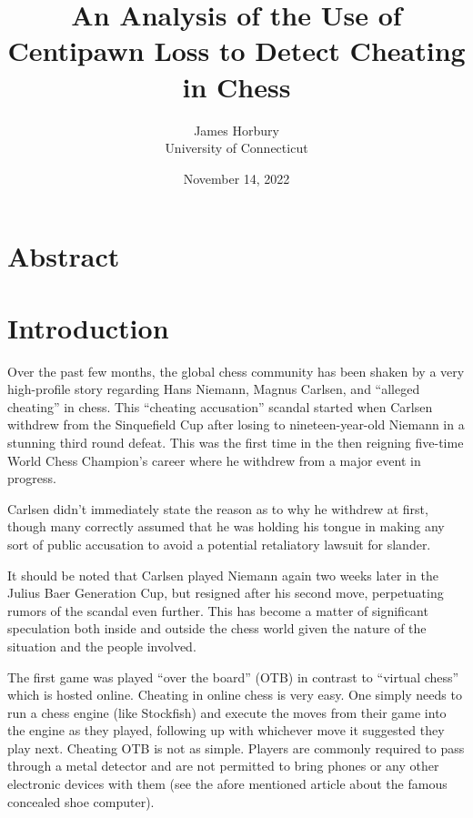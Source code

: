 \documentclass[12pt]{article}
\title{An Analysis of the Use of Centipawn Loss to Detect Cheating in Chess}
\author{James Horbury\\
    University of Connecticut
}
\date{November 14, 2022}
\begin{document}
\maketitle

\section*{Abstract}
\label{sec:abs}


\section*{Introduction}
\label{sec:intro}

Over the past few months, the global chess community has been shaken by a very high-profile story regarding Hans Niemann, Magnus Carlsen, and “alleged cheating” in chess. This “cheating accusation” scandal started when Carlsen withdrew from the Sinquefield Cup after losing to nineteen-year-old Niemann in a stunning third round defeat. This was the first time in the then reigning five-time World Chess Champion's career where he withdrew from a major event in progress.


Carlsen didn't immediately state the reason as to why he withdrew at first, though many correctly assumed that he was holding his tongue in making any sort of public accusation to avoid a potential retaliatory lawsuit for slander.

It should be noted that Carlsen played Niemann again two weeks later in the Julius Baer Generation Cup, but resigned after his second move, perpetuating rumors of the scandal even further. 
This has become a matter of significant speculation both inside and outside the chess world given the nature of the situation and the people involved. 

The first game was played “over the board” (OTB) in contrast to “virtual chess” which is hosted online. Cheating in online chess is very easy. One simply needs to run a chess engine (like Stockfish) and execute the moves from their game into the engine as they played, following up with whichever move it suggested they play next. Cheating OTB is not as simple. Players are commonly required to pass through a metal detector and are not permitted to bring phones or any other electronic devices with them (see the afore mentioned article about the famous concealed shoe computer).
\end{document}
